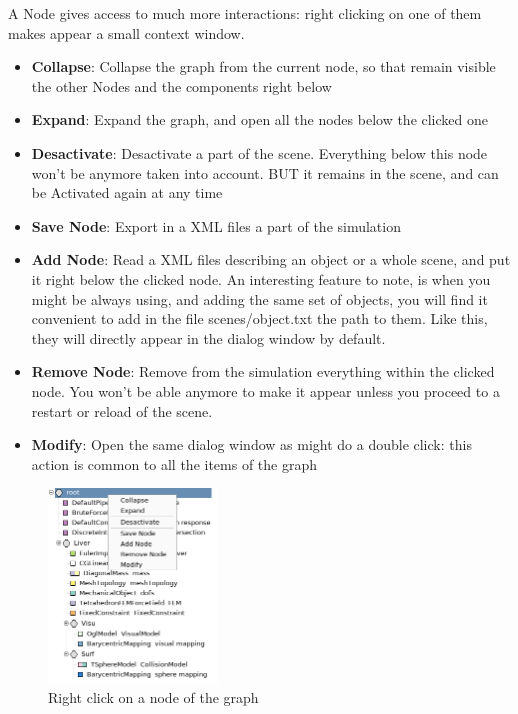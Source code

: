 \par
A Node gives access to much more interactions: right clicking on one of them makes appear a small context window.
\begin{itemize}
 \item {\bf Collapse}: Collapse the graph from the current node, so that remain visible the other Nodes and the components right below
 \item {\bf Expand}: Expand the graph, and open all the nodes below the clicked one
 \item {\bf Desactivate}: Desactivate a part of the scene. Everything below this node won't be anymore taken into account. BUT it remains in the scene, and can be Activated again at any time
 \item {\bf Save Node}: Export in a XML files a part of the simulation
 \item {\bf Add Node}: Read a XML files describing an object or a whole scene, and put it right below the clicked node.
An interesting feature to note, is when you might be always using, and adding the same set of objects, you will find it convenient to add in the file scenes/object.txt the path to them. Like this, they will directly appear in the dialog window by default.
 \item {\bf Remove Node}: Remove from the simulation everything within the clicked node. You won't be able anymore to make it appear unless you proceed to a restart or reload of the scene.
 \item {\bf Modify}: Open the same dialog window as might do a double click: this action is common to all the items of the graph
\end{itemize}

\begin{figure}[htpb]
	\centering
		\includegraphics[width=0.4\textwidth]{GUI/GUI_interaction.png}
	\caption{Right click on a node of the graph}
\end{figure}








